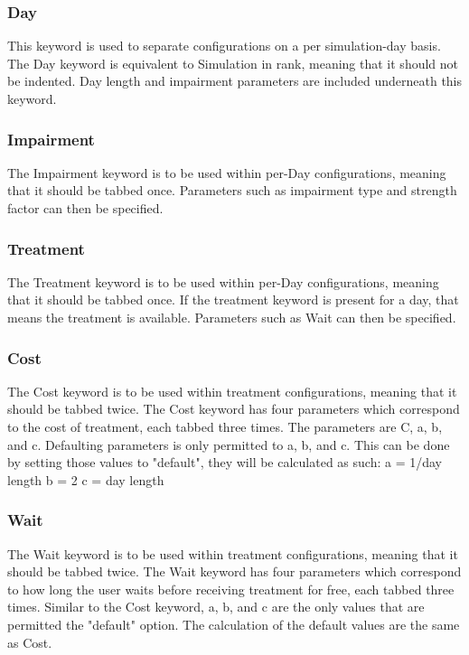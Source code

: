 \documentclass{article}
\begin{document}
\subsubsection{Day}
This keyword is used to separate configurations on a per simulation-day basis.
The Day keyword is equivalent to Simulation in rank, meaning that it should not
be indented. Day length and impairment parameters are included underneath
this keyword.

\subsubsection{Impairment}
The Impairment keyword is to be used within per-Day configurations, meaning
that it should be tabbed once. Parameters such as impairment type and strength
factor can then be specified.

\subsubsection{Treatment}
The Treatment keyword is to be used within per-Day configurations, meaning
that it should be tabbed once. If the treatment keyword is present for a day,
that means the treatment is available. Parameters such as Wait can then be specified.

\subsubsection{Cost}
The Cost keyword is to be used within treatment configurations, meaning that
it should be tabbed twice. The Cost keyword has four parameters which correspond to the cost of treatment, each tabbed three times. The parameters are C, a, b, and c. Defaulting parameters is only permitted to a, b, and c. This can be done by setting those values to "default", they will be calculated as such:
    a = 1/day length
    b = 2
    c = day length
    

\subsubsection{Wait}
The Wait keyword is to be used within treatment configurations, meaning that
it should be tabbed twice. The Wait keyword has four parameters which correspond to how long the user waits before receiving treatment for free, each tabbed three times. Similar to the Cost keyword, a, b, and c are the only values that are permitted the "default" option. The calculation of the default values are the same as Cost. 
\end{document}
